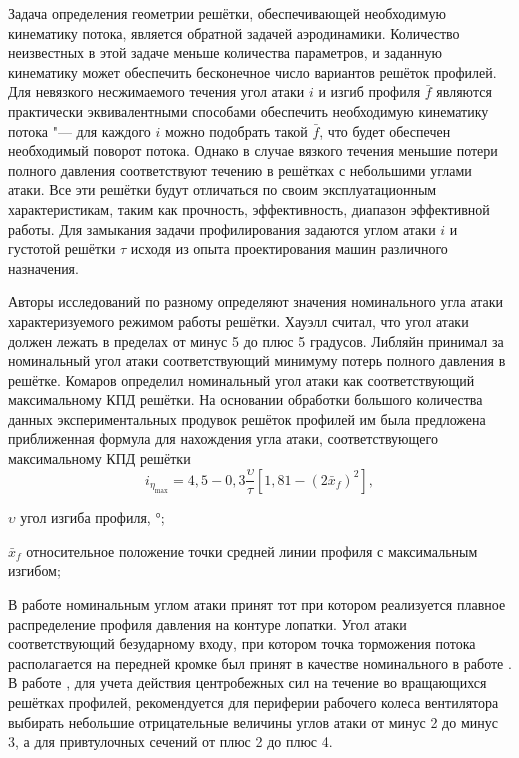 Задача определения геометрии решётки, обеспечивающей необходимую кинематику потока, является обратной задачей аэродинамики. Количество неизвестных в этой задаче меньше количества параметров, и заданную кинематику может обеспечить бесконечное число вариантов решёток профилей. Для невязкого несжимаемого течения угол атаки \(i\) и изгиб профиля \(\bar{f}\) являются практически эквивалентными способами обеспечить необходимую кинематику потока "--- для каждого \(i\) можно подобрать такой \(\bar{f}\), что будет обеспечен необходимый поворот потока. Однако в случае вязкого течения меньшие потери полного давления соответствуют течению в решётках с небольшими углами атаки. Все эти решётки будут отличаться по своим эксплуатационным характеристикам, таким как прочность, эффективность, диапазон эффективной работы. Для замыкания задачи профилирования задаются углом атаки \(i\) и густотой решётки \(\tau\) исходя из опыта проектирования машин различного назначения.

Авторы исследований по разному определяют значения номинального угла атаки характеризуемого режимом работы решётки. Хауэлл \cite{Howell1945} считал, что угол атаки должен лежать в пределах от минус 5 до плюс 5 градусов. Либляйн \cite{Lieblein1959} принимал за номинальный угол атаки соответствующий минимуму потерь полного давления в решётке. Комаров \cite{Komarov1967} определил номинальный угол атаки как соответствующий максимальному КПД решётки. На основании обработки большого количества данных экспериментальных продувок решёток профилей им была предложена приближенная формула для нахождения угла атаки, соответствующего максимальному КПД решётки
\begin{equation}
	i_{\eta_\text{max}}=4,5-0,3\frac{\upsilon}{\tau} \left[ 1,81- \left(2\bar{x}_{f}\right)^2 \right],
\end{equation}
\begin{eqexpl}
	\item{\(\upsilon\)} угол изгиба профиля, \(\si\degree\);
	\item{\(\bar{x}_f\)} относительное положение точки средней линии профиля с максимальным изгибом;
\end{eqexpl}
В работе \cite{Emery1951} номинальным углом атаки принят тот при котором реализуется плавное распределение профиля давления на контуре лопатки. Угол атаки соответствующий безударному входу, при котором точка торможения потока располагается на передней кромке был принят в качестве номинального в работе \cite{Judin1947}. В работе \cite{Brusilovskiy1986}, для учета действия центробежных сил на течение во вращающихся решётках профилей, рекомендуется для периферии рабочего колеса вентилятора выбирать  небольшие отрицательные величины углов атаки от минус 2 до минус 3, а для привтулочных сечений от плюс 2 до плюс 4.

